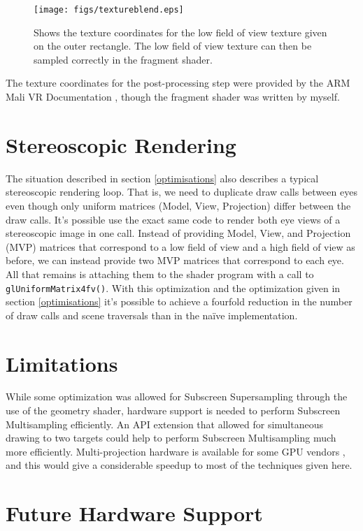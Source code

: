 \documentclass[12pt,a4paper,twoside,openright]{report}
\begin{document}
\begin{figure}[h]
\centerline{\texttt{[image: figs/textureblend.eps]}}
\caption{Shows the texture coordinates for the low field of view texture given on the outer rectangle. The low field of view texture can then be sampled correctly in the fragment shader.}
\label{fig:texblend}
\end{figure}

\noindent The texture coordinates for the post-processing step were provided by the ARM Mali VR Documentation \cite{armDeveloper}, though the fragment shader was written by myself. 

\section{Stereoscopic Rendering}\label{stereoScopic}

The situation described in section \ref{optimisations} also describes a typical stereoscopic rendering loop. That is, we need to duplicate draw calls between eyes even though only uniform matrices (Model, View, Projection) differ between the draw calls. It's possible use the exact same code to render both eye views of a stereoscopic image in one call. Instead of providing Model, View, and Projection (MVP) matrices that correspond to a low field of view and a high field of view as before, we can instead provide two MVP matrices that correspond to each eye. All that remains is attaching them to the shader program with a call to \texttt{glUniformMatrix4fv()}. With this optimization and the optimization given in section \ref{optimisations} it's possible to achieve a fourfold reduction in the number of draw calls and scene traversals than in the na\"ive implementation.

\section{Limitations}

While some optimization was allowed for Subscreen Supersampling through the use of the geometry shader, hardware support is needed to perform Subscreen Multisampling efficiently.
An API extension that allowed for simultaneous drawing to two targets could help to perform Subscreen Multisampling much more efficiently.
Multi-projection hardware is available for some GPU vendors \cite{multiResShading}, and this would give a considerable speedup to most of the techniques given here. 

\section{Future Hardware Support}
\end{document}
